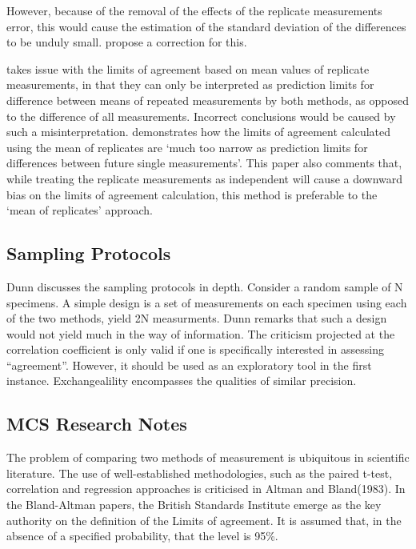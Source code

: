 \documentclass[12pt, a4paper]{report}
\theoremstyle{plain}
\theoremstyle{definition}
\theoremstyle{remark}
\begin{document}
	However, because of the removal of the effects of the replicate
	measurements error, this would cause the estimation of the
	standard deviation of the differences to be unduly small.
	\citet*{BA86} propose a correction for this.
	
	\citet{BXC2008} takes issue with the limits of agreement based on
	mean values of replicate measurements, in that they can only be interpreted as prediction
	limits for difference between means of repeated measurements by
	both methods, as opposed to the difference of all measurements.
	Incorrect conclusions would be caused by such a misinterpretation.
	\citet{BXC2008} demonstrates how the limits of agreement
	calculated using the mean of replicates are `much too narrow as
	prediction limits for differences between future single
	measurements'. This paper also comments that, while treating the
	replicate measurements as independent will cause a downward bias
	on the limits of agreement calculation, this method is preferable
	to the `mean of replicates' approach.
	
	

\subsection{Sampling Protocols}
Dunn discusses the sampling protocols in depth. Consider a random sample of N specimens. A simple design is a  set of measurements on each specimen using each of the two methods, yield 2N measurments. Dunn remarks that such a design would not yield much in the way of information.
The criticism projected at the correlation coefficient is only valid if one is specifically interested in assessing “agreement”. However, it should be used as an exploratory tool in the first instance.
Exchangealility encompasses the qualities of similar precision.



	
\subsection{MCS Research Notes}
The problem of comparing two methods of measurement is ubiquitous in scientific literature.
The use of  well-established methodologies, such as the paired t-test, correlation and regression approaches is criticised in Altman and Bland(1983).
In the Bland-Altman papers, the British Standards Institute emerge as the key authority on the definition of the Limits of agreement.
It is assumed that, in the absence of a specified probability, that the level is 95\%.
\end{document}
